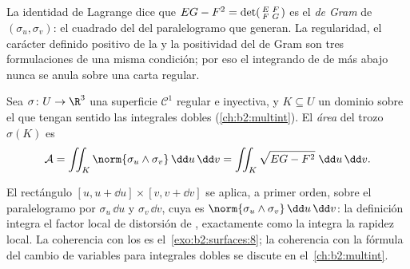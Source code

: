 \begin{remark}
La identidad de Lagrange dice que $EG - F^2 =
\det\begin{psmallmatrix} E & F\\ F & G\end{psmallmatrix}$ es el
\emph{ de Gram} de $(\sigma_u, \sigma_v)$: el cuadrado del
 del paralelogramo que generan. La regularidad, el carácter
definido positivo de la  y la positividad
del  de Gram son tres formulaciones de una misma
condición; por eso el integrando de  de más abajo nunca se anula
sobre una carta regular.
\end{remark}

\begin{definition}[Área]\label{def:b2:surfaces:area}
Sea $\sigma \colon U \to \R^3$ una superficie $\mathcal{C}^1$
regular e inyectiva, y $K \subseteq U$ un dominio  sobre el
que tengan sentido las integrales dobles (\cref{ch:b2:multint}). El
\emph{área} del trozo $\sigma(K)$ es
\[
\mathcal{A}
= \iint_K \norm{\sigma_u \wedge \sigma_v}\,\dd u\,\dd v
= \iint_K \sqrt{EG - F^2}\;\dd u\,\dd v .
\]
\end{definition}

\begin{remark}
El rectángulo $[u, u + \dd u] \times [v, v + \dd v]$ se aplica, a
primer orden, sobre el paralelogramo  por $\sigma_u\,\dd u$ y
$\sigma_v\,\dd v$, cuya  es $\norm{\sigma_u \wedge
\sigma_v}\,\dd u\,\dd v$: la definición integra el factor local de
distorsión de , exactamente como la  integra la
rapidez local. La coherencia con los  es el~\cref{exo:b2:surfaces:8}; la coherencia con la fórmula del cambio de
variables para integrales dobles se discute en el~\cref{ch:b2:multint}.
\end{remark}

